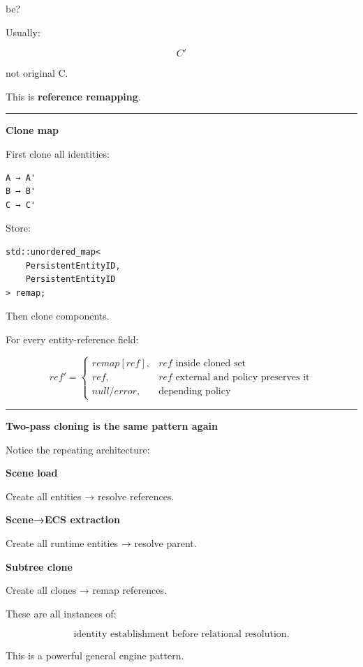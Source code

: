be?

Usually:

\[
C'
\]

not original C.

This is \textbf{reference remapping}.

\begin{center}\rule{0.5\linewidth}{0.5pt}\end{center}

\textbf{Clone map}

First clone all identities:

\begin{verbatim}
A → A'
B → B'
C → C'
\end{verbatim}

Store:

\begin{verbatim}
std::unordered_map<
    PersistentEntityID,
    PersistentEntityID
> remap;
\end{verbatim}

Then clone components.

For every entity-reference field:

\[
ref'=
\begin{cases}
remap[ref],&ref\text{ inside cloned set}\\
ref,&ref\text{ external and policy preserves it}\\
null/error,&\text{depending policy}
\end{cases}
\]

\begin{center}\rule{0.5\linewidth}{0.5pt}\end{center}

\textbf{Two-pass cloning is the same pattern again}

Notice the repeating architecture:

\textbf{Scene load}

Create all entities → resolve references.

\textbf{Scene→ECS extraction}

Create all runtime entities → resolve parent.

\textbf{Subtree clone}

Create all clones → remap references.

These are all instances of:

\[
\boxed{
\text{identity establishment before relational resolution}.
}
\]

This is a powerful general engine pattern.

